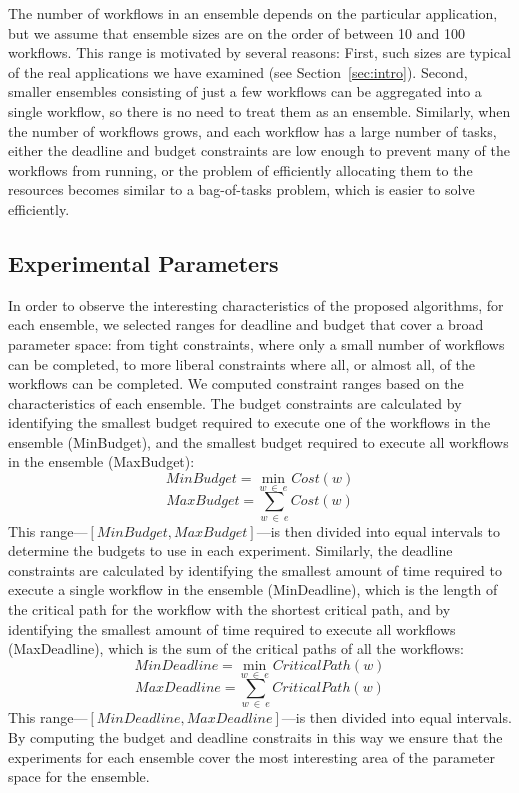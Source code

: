\documentclass[conference]{IEEEtran}
\begin{document}
The number of workflows in an ensemble depends on the particular application,
but we assume that ensemble sizes are on the order of between 10 and 100
workflows. This range is motivated by several reasons: First, such sizes are
typical of the real applications we have examined (see Section~\ref{sec:intro}). 
Second, smaller ensembles consisting of
just a few workflows can be aggregated into a single workflow, so there is no need to
treat them as an ensemble. Similarly, when the number of workflows grows, and
each workflow has a large number of tasks, either the deadline and budget
constraints are low enough to prevent many of the workflows from running, or the
problem of efficiently allocating them to the resources becomes similar to a
bag-of-tasks problem, which is easier to solve efficiently.



\subsection{Experimental Parameters}
\label{sec:exp-parameters}

In order to observe the interesting characteristics of the proposed algorithms,
for each ensemble, we selected ranges for deadline and budget that cover a broad
parameter space: from tight constraints, where only a small number of workflows can be completed,
to more liberal constraints where all, or almost all, of the workflows can be
completed. We computed constraint ranges based on
the characteristics of each ensemble. The budget constraints are calculated by
identifying the smallest budget required to execute one of the workflows in the
ensemble (MinBudget), and the smallest budget required to execute all workflows
in the ensemble (MaxBudget):
%
%
$$
MinBudget = \min_{w\ \in\ e}{Cost(w)}
$$
$$
MaxBudget = \sum_{w\ \in\ e}{Cost(w)}
$$
%
This range---$[MinBudget, MaxBudget]$---is then divided into equal intervals to
determine the budgets to use in each experiment. Similarly, the deadline
constraints are calculated by identifying the smallest amount
of time required to execute a single workflow in the ensemble (MinDeadline),
which is the length of the critical path for the workflow with the shortest
critical path, and by identifying the smallest amount of time required to
execute all workflows (MaxDeadline), which is the sum of the critical paths of
all the workflows:
%
%
$$
MinDeadline = \min_{w\ \in\ e}{CriticalPath(w)}
$$
$$
MaxDeadline = \sum_{w\ \in\ e}{CriticalPath(w)}
$$
%
This range---$[MinDeadline, MaxDeadline]$---is then divided into equal intervals. 
By computing the budget and deadline constraits in this way we ensure that the
experiments for each ensemble cover the most interesting area of the parameter space for the
ensemble.
\end{document}
